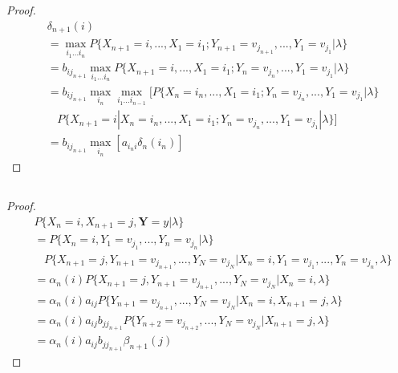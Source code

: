 \documentclass[runningheads]{llncs}
\begin{document}
    \subsection{}
    \begin{proof}
        \begin{align}
            &\delta_{n+1}(i) \\
            &= \max_{i_1...i_{n}} P \{ X_{n+1} = i,..., X_1 = i_1; Y_{n+1} = v_{j_{n+1}},..., Y_1 = v_{j_1} |\lambda \} \\
            &= b_{i j_{n+1}} \max_{i_1...i_{n}} P \{ X_{n+1} = i,..., X_1 = i_1; Y_{n} = v_{j_n},..., Y_1 = v_{j_1} |\lambda \} \\
            &= b_{i j_{n+1}} \max_{i_n} \max_{i_1...i_{n-1}} [ P \{ X_{n} = i_n,..., X_1 = i_1; Y_{n} = v_{j_n},..., Y_1 = v_{j_1} |\lambda \} \\
            & \ \ \ \ P \{ X_{n+1} = i | X_{n} = i_n,..., X_1 = i_1; Y_{n} = v_{j_n},..., Y_1 = v_{j_1} |\lambda \} ] \\
            &= b_{i j_{n+1}} \max_{i_n} [a_{i_n i} \delta_{n}(i_n)]
        \end{align}
    \end{proof}
    \subsection{}
    \begin{proof}
        \begin{align}
            &P \{ X_n = i, X_{n+1} = j, \mathbf{Y} = y | \lambda \} \\
            &= P \{ X_n = i, Y_1 = v_{j_1},..., Y_n = v_{j_n} | \lambda \} \\
            & \ \ \ \ P \{ X_{n+1} = j, Y_{n+1} = v_{j_{n+1}},..., Y_N = v_{j_N} | X_n = i, Y_1 = v_{j_1},..., Y_n = v_{j_n}, \lambda \} \\ 
            &= \alpha_n(i) P \{ X_{n+1} = j, Y_{n+1} = v_{j_{n+1}},..., Y_N = v_{j_N} | X_n = i, \lambda \} \\
            &= \alpha_n(i) a_{ij} P \{ Y_{n+1} = v_{j_{n+1}},..., Y_N = v_{j_N} | X_n = i, X_{n+1} = j, \lambda \} \\
            &= \alpha_n(i) a_{ij} b_{jj_{n+1}} P \{ Y_{n+2} = v_{j_{n+2}},..., Y_N = v_{j_N} | X_{n+1} = j, \lambda \} \\
            &= \alpha_n(i) a_{ij} b_{jj_{n+1}} \beta_{n+1} (j)
        \end{align}
    \end{proof}
\end{document}
